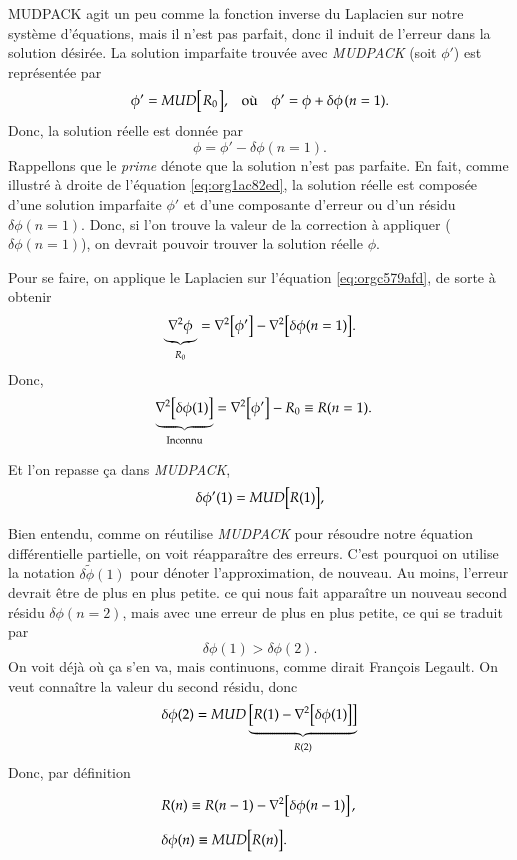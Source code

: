 \documentclass[10pt]{article}
\numberwithin{equation}{section}
\newcommand{\pt}{\hspace{1pt}}
\newcommand{\tall}{\vphantom{A^{x^x}_p}}
\newcommand{\grande}{\vphantom{\frac{1}{xx}}}
\newcommand{\tphi}{\tilde{\phi}}
\begin{document}
MUDPACK agit un peu comme la fonction inverse du Laplacien sur notre système d'équations, mais il n'est pas parfait, donc il induit de l'erreur dans la solution désirée.
La solution imparfaite trouvée avec \emph{MUDPACK} (soit \(\phi'\)) est représentée par 
\begin{align}
\label{eq:org1ac82ed}
   && \phi' = MUD\qty[\pt R_0\pt\tall ], && \text{où} && \phi' = \phi + \delta\phi\pt(n=1).&&
\end{align}
Donc, la solution réelle est donnée par
\begin{equation}
\label{eq:orgc579afd}
   \phi = \phi' - \delta\phi(n=1).
\end{equation}
Rappellons que le \emph{prime} dénote que la solution n'est pas parfaite. En fait, comme illustré à droite de l'équation \ref{eq:org1ac82ed}, la solution réelle est composée d'une solution imparfaite \(\phi'\) et d'une composante d'erreur ou d'un résidu \(\delta \phi(n=1)\).
Donc, si l'on trouve la valeur de la correction à appliquer (\(\delta\phi(n=1)\)), on devrait pouvoir trouver la solution réelle \(\phi\).\bigskip

Pour se faire, on applique le Laplacien sur l'équation \ref{eq:orgc579afd}, de sorte à obtenir
\begin{equation}
   \underbrace{\laplacian{\phi}}_{R_0} = \laplacian[\phi'] - \laplacian[\delta\phi(n=1)].
\end{equation}
Donc,
\begin{equation}
   \hspace{2mm} \underbrace{\laplacian[\delta\phi(1)]}_\text{Inconnu} = \laplacian[\phi'] - R_0 \equiv R(n=1).
\end{equation}

Et l'on repasse ça dans \emph{MUDPACK},
\begin{equation}
   \delta\phi'(1) = MUD\qty[\tall R(1) ],
\end{equation}


Bien entendu, comme on réutilise \emph{MUDPACK} pour résoudre notre équation différentielle partielle, on voit réapparaître des erreurs.
C'est pourquoi on utilise la notation \(\delta \tphi(1)\) pour dénoter l'approximation, de nouveau.
Au moins, l'erreur devrait être de plus en plus petite.
ce qui nous fait apparaître un nouveau second résidu \(\delta\phi(n=2)\), mais avec une erreur de plus en plus petite, ce qui se traduit par
\begin{equation}
   \delta\phi(1) > \delta\phi(2).
\end{equation}
On voit déjà où ça s'en va, mais continuons, comme dirait François Legault.
On veut connaître la valeur du second résidu, donc
\begin{equation}
   \delta \phi(2) = MUD\underbrace{\qty[R(1)\tall - \laplacian[\delta\phi(1)]]}_{R(2)}
\end{equation}
Donc, par définition
\begin{align}
   & R(n) \equiv R(n-1) - \laplacian[\delta\phi(n-1)\tall]\pt,\grande\\
   & \delta\phi(n) \equiv MUD\qty[R(n)\tall].\grande
\end{align}
\end{document}
